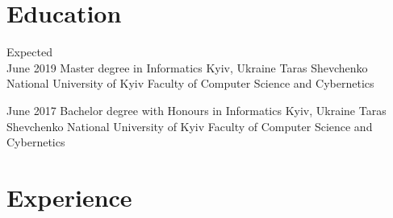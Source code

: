 \documentclass[letterpaper]{twentysecondcv} %
\begin{document}
\makeprofile %

\section{Education}

\begin{twenty} %
	\twentyitem
    	{Expected \\ June 2019}
        {Master degree in Informatics}
         {Kyiv, Ukraine}
        {Taras Shevchenko National University of Kyiv}
        {Faculty of Computer Science and Cybernetics}
        
	\twentyitem
    	{June 2017}
        {Bachelor degree with Honours in Informatics}
        {Kyiv, Ukraine}
        {Taras Shevchenko National University of Kyiv}
        {Faculty of Computer Science and Cybernetics}
        
\end{twenty}



\section{Experience}
\end{document}
